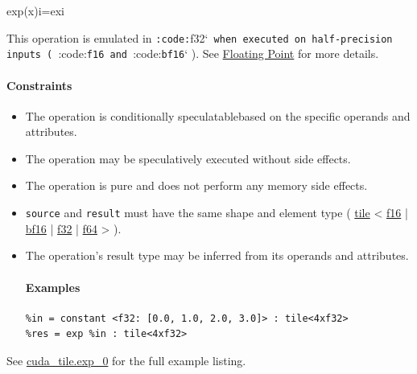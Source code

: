 \documentclass{article}
\begin{document}
exp(x)i=exi

This operation is emulated in \texttt{:code:}f32`\texttt{ when executed on half-precision inputs ( }:code:\texttt{f16}\texttt{ and }:code:\texttt{bf16}` ). See \href{https://docs.nvidia.com/cuda/tile-ir/latest/sections/operations.html#op-group-floating-point}{Floating Point} for more details.



\paragraph{Constraints}

\begin{itemize}
\item The operation is conditionally speculatablebased on the specific operands and attributes.
\item The operation may be speculatively executed without side effects.
\item The operation is pure and does not perform any memory side effects.
\item \texttt{source} and \texttt{result} must have the same shape and element type ( \href{https://docs.nvidia.com/cuda/tile-ir/latest/sections/types.html#type-tile}{tile} < \href{https://docs.nvidia.com/cuda/tile-ir/latest/sections/types.html#subsection-element-types}{f16} | \href{https://docs.nvidia.com/cuda/tile-ir/latest/sections/types.html#subsection-element-types}{bf16} | \href{https://docs.nvidia.com/cuda/tile-ir/latest/sections/types.html#subsection-element-types}{f32} | \href{https://docs.nvidia.com/cuda/tile-ir/latest/sections/types.html#subsection-element-types}{f64} > ).
\item The operation's result type may be inferred from its operands and attributes.


\paragraph{Examples}

\begin{lstlisting}
%in = constant <f32: [0.0, 1.0, 2.0, 3.0]> : tile<4xf32>
%res = exp %in : tile<4xf32>
\end{lstlisting}

\end{itemize}
See \href{https://docs.nvidia.com/cuda/tile-ir/latest/sections/appendix.html#example-cuda-tile-exp-0}{cuda\_tile.exp\_0} for the full example listing.
\end{document}
